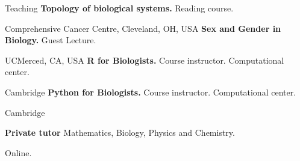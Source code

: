 \begin{rubric}{Teaching}
\entry*[2023]%
	\textbf{Topology of biological systems.} Reading course. \par Comprehensive Cancer Centre, Cleveland, OH, USA
 \entry*[2023]%
	\textbf{Sex and Gender in Biology.} Guest Lecture. \par UCMerced, CA, USA
\entry*[2018-2020]%
	\textbf{R for Biologists.} Course instructor. Computational center. \par Cambridge
 \entry*[2018-2020]%
	\textbf{Python for Biologists.} Course instructor. Computational center. \par Cambridge

 \entry*[2014--2022]%
	\textbf{Private tutor} Mathematics, Biology, Physics and Chemistry. \par Online.
%
\end{rubric}